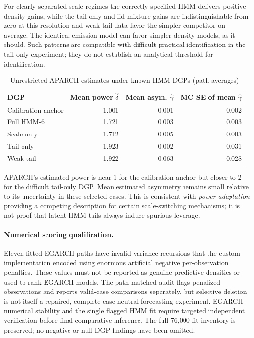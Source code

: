 \documentclass[11pt,a4paper]{article}
\begin{document}
For clearly separated scale regimes the correctly specified HMM delivers positive density gains, while the tail-only and iid-mixture gains are indistinguishable from zero at this resolution and weak-tail data favor the simpler competitor on average. The identical-emission model can favor simpler density models, as it should. Such patterns are compatible with difficult practical identification in the tail-only experiment; they do not establish an analytical threshold for identification.

\begin{table}[htbp]\centering\small
\caption{Unrestricted APARCH estimates under known HMM DGPs (path averages)}\label{tab:aparch_attrib}
\begin{tabular}{lrrr}\toprule
DGP & Mean power $\hat\delta$ & Mean asym. $\hat\gamma$ & MC SE of mean $\hat\gamma$ \\\midrule
Calibration anchor & 1.001 & 0.001 & 0.002 \\ 
Full HMM-6 & 1.721 & 0.003 & 0.003 \\ 
Scale only & 1.712 & 0.005 & 0.003 \\ 
Tail only & 1.923 & 0.002 & 0.031 \\ 
Weak tail & 1.922 & 0.063 & 0.028 \\ 
\bottomrule\end{tabular}
\end{table}

APARCH's estimated power is near 1 for the calibration anchor but closer to 2 for the difficult tail-only DGP. Mean estimated asymmetry remains small relative to its uncertainty in these selected cases. This is consistent with \emph{power adaptation} providing a competing description for certain scale-switching mechanisms; it is not proof that latent HMM tails always induce spurious leverage.

\paragraph{Numerical scoring qualification.} Eleven fitted EGARCH paths have invalid variance recursions that the custom implementation encoded using enormous artificial negative per-observation penalties. These values must not be reported as genuine predictive densities or used to rank EGARCH models. The path-matched audit flags penalized observations and reports valid-case comparisons separately, but selective deletion is not itself a repaired, complete-case-neutral forecasting experiment. EGARCH numerical stability and the single flagged HMM fit require targeted independent verification before final comparative inference. The full 76,000-fit inventory is preserved; no negative or null DGP findings have been omitted.
\end{document}
